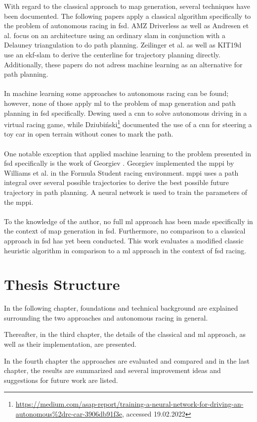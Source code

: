 With regard to the classical approach to map generation, several techniques have been documented. The following papers apply a classical algorithm specifically to the problem of autonomous racing in \ac{fsd}. AMZ Driverless \cite{kabzan2019amz} as well as Andresen et al. \cite{andresen2020} focus on an architecture using an ordinary \ac{slam} in conjunction with a Delauney triangulation to do path planning. Zeilinger et al. \cite{zeilinger2017} as well as KIT19d \cite{nekkah2020} use an \ac{ekf}-\ac{slam} to derive the centerline for trajectory planning directly. Additionally, these papers do not adress machine learning as an alternative for path planning.\\
\\
In machine learning some approaches to autonomous racing can be found; however, none of those apply \ac{ml} to the problem of map generation and path planning in \ac{fsd} specifically. Dewing \cite{DewingNowTI}
used a \ac{cnn} to solve autonomous driving in a virtual racing game, while Dziubiński\footnote{\url{https://medium.com/asap-report/training-a-neural-network-for-driving-an-autonomous\%2drc-car-3906db91f3e}, accessed 19.02.2022} documented the use of a \ac{cnn} for steering a toy car in open terrain without cones to mark the path.\\
\\
One notable exception that applied machine learning to the problem presented in \ac{fsd} specifically is the work of Georgiev \cite{georgiev2019}. Georgiev implemented the \ac{mppi} by Williams et al. \cite{williams2016} in the Formula Student racing environment. \ac{mppi} uses a path integral over several possible trajectories to derive the best possible future trajectory in path planning. A neural network is used to train the parameters of the \ac{mppi}.\\
\\
To the knowledge of the author, no full \ac{ml} approach has been made specifically in the context of map generation in \ac{fsd}. Furthermore, no comparison to a classical approach in \ac{fsd} has yet been conducted. This work evaluates a modified classic heuristic algorithm in comparison to a \ac{ml} approach in the context of \ac{fsd} racing.

\section{Thesis Structure}
In the following chapter, foundations and technical background are explained surrounding the two approaches and autonomous racing in general.

Thereafter, in the third chapter, the details of the classical and \ac{ml} approach, as well as their implementation, are presented.

In the fourth chapter the approaches are evaluated and compared
and in the last chapter, the results are summarized and several improvement ideas and suggestions for future work are listed.

